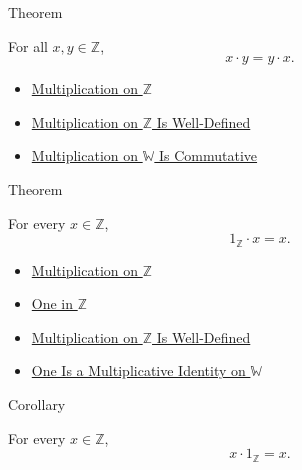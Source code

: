 \begin{theorembox}{Theorem}
\begin{theorem}
\label{thm:multiplication-on-z-commutative}
For all $x,y\in\mathbb{Z}$,
\[
x\cdot y=y\cdot x.
\]
\end{theorem}
\end{theorembox}

\begin{dependencies}
\begin{itemize}
  \item \hyperref[def:multiplication-on-z-classes]{Multiplication on $\mathbb{Z}$}
  \item \hyperref[thm:multiplication-on-z-well-defined]{Multiplication on $\mathbb{Z}$ Is Well-Defined}
  \item \hyperref[thm:multiplication-on-w-commutative]{Multiplication on $\mathbb{W}$ Is Commutative}
\end{itemize}
\end{dependencies}

\begin{theorembox}{Theorem}
\begin{theorem}
\label{thm:one-left-multiplicative-identity-on-z}
For every $x\in\mathbb{Z}$,
\[
1_{\mathbb{Z}}\cdot x=x.
\]
\end{theorem}
\end{theorembox}

\begin{dependencies}
\begin{itemize}
  \item \hyperref[def:multiplication-on-z-classes]{Multiplication on $\mathbb{Z}$}
  \item \hyperref[def:one-in-z]{One in $\mathbb{Z}$}
  \item \hyperref[thm:multiplication-on-z-well-defined]{Multiplication on $\mathbb{Z}$ Is Well-Defined}
  \item \hyperref[thm:one-multiplicative-identity-on-w]{One Is a Multiplicative Identity on $\mathbb{W}$}
\end{itemize}
\end{dependencies}

\begin{corollarybox}{Corollary}
\begin{corollary}
\label{cor:one-right-multiplicative-identity-on-z}
For every $x\in\mathbb{Z}$,
\[
x\cdot 1_{\mathbb{Z}}=x.
\]
\end{corollary}
\end{corollarybox}


